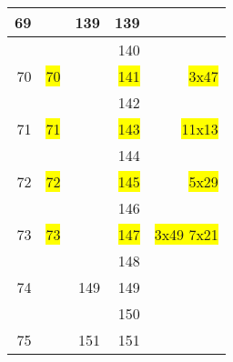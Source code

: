 \begin{tabular}{|r|r|r|r|r|}
    \hline               69             &                        &     139 &    139    &                                \\
    \hline                              &                        &         &    140    &                                \\
    \hline               70             &   \colorbox{yellow}{70}&         &    \colorbox{yellow}{141}    &     \colorbox{yellow}{3x47  }  \\
    \hline                              &                        &         &    142    &                                \\
    \hline               71             &   \colorbox{yellow}{71}&         &    \colorbox{yellow}{143}    &     \colorbox{yellow}{11x13  } \\
    \hline                              &                        &         &    144    &                                \\
    \hline               72             &   \colorbox{yellow}{72}&         &    \colorbox{yellow}{145}    &     \colorbox{yellow}{5x29  }  \\
    \hline                              &                        &         &    146    &                                \\
    \hline               73             &   \colorbox{yellow}{73}&         &    \colorbox{yellow}{147}    &   \colorbox{yellow}{3x49 7x21} \\
    \hline                              &                        &         &    148    &                                \\
    \hline               74             &                        &    149  &    149    &                                \\
    \hline                              &                        &         &    150    &                                \\
    \hline               75             &                        &    151  &    151    &                                \\
    \hline                                                      
\end{tabular}

\normalfont
\pagebreak 

